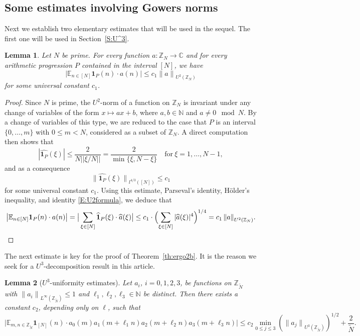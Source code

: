 \documentclass[11pt]{amsart}
\newtheorem{lemma}{Lemma}[section]
\theoremstyle{definition}
\begin{document}
\subsection{Some estimates involving Gowers norms}
\label{subsec:gowers}
Next we establish
two elementary estimates that will be  used in the sequel.
The first one will be used in Section~\ref{S:U^3}.
\begin{lemma}
\label{lem:U2-intervals}  Let $N$ be prime. For every  function $a\colon {{\mathbb Z}}_N\to {{\mathbb C}}$
 and for every arithmetic progression $P$ contained in the
interval $[N]$, we have
$$
 \big|{{\mathbb E}}_{n\in [N]}{\mathbf{1}}_P(n)\cdot a(n) \big|\leq
 c_1{\lVert {a} \rVert}_{U^2({{\mathbb Z}}_N)}
$$
for some universal constant $c_1$.
\end{lemma}
\begin{proof}
Since $N$ is prime, the $U^2$-norm of a function on ${{\mathbb Z}}_N$ is
invariant under any change of variables of the form $x\mapsto ax+b$,
where $a,b\in{{\mathbb N}}$  and $a\neq 0 \! \! \! \mod{N}$. By a change of variables of this
type, we are reduced to the case that $P$ is an interval
$\{0,\dots,m\}$ with $0\leq m<N$, considered as a subset of
${{\mathbb Z}}_N$. A direct computation then shows that
$$
 |\widehat{{\mathbf{1}}_P}(\xi)|\leq
\frac{2}{N||\xi/N||}= \frac{2}{\min\{\xi,N-\xi\}}  \quad \text{for
}\ \xi=1,\ldots,N-1,
$$
and as a consequence
$$
{\lVert {\widehat{{\mathbf{1}}_P}(\xi)} \rVert}_{l^{4/3}([N])}
\leq c_1
$$
for some universal constant $c_1$. Using this estimate, Parseval's
identity,   H\"older's inequality, and identity \eqref{E:U2formula},
we deduce that
$$
\big|{{\mathbb E}}_{n\in [N]}{\mathbf{1}}_P(n)\cdot a(n) \big|=\big|\sum_{\xi\in [N]}\widehat {\mathbf{1}}_P(\xi)\cdot \widehat a(\xi) \big|\leq
c_1\cdot\Bigl(\sum_{\xi\in[N]} |\widehat a(\xi)|^4\Bigr)^{1/4}=
c_1\,{\lVert a \rVert}_{U^2({{\mathbb Z}}_N)}.{}
$$

\end{proof}
The next estimate is key for the proof of Theorem~\ref{th:ergo2b}.
It is the reason we seek for  a $U^3$-decomposition result in this
article.
\begin{lemma}[$U^3$-uniformity estimates]\label{L:UnifromityEstimates2}
Let  $a_i$, $i=0,1,2,3$, be functions on ${{{\mathbb Z}}_{\widetilde N}}$ with
${\lVert {a_i} \rVert}_{L^\infty({{{\mathbb Z}}_{\widetilde N}})}\leq 1$ and $\ell_1,\ell_2,\ell_3\in {{\mathbb N}}$ be distinct. Then
there exists a constant $c_2$, depending only on $\ell$, such that
 $$
\big|{{\mathbb E}}_{m,n\in{{{\mathbb Z}}_{\widetilde N}}}{\mathbf{1}}_{[N]}(n)\cdot a_0(m)
a_1(m+\ell_1n) a_2(m+\ell_2n)a_3(m+\ell_3n)\big| \leq c_2
\min_{0\leq j\leq 3}({\lVert {a_j} \rVert}_{U^3({{{\mathbb Z}}_{\widetilde N}})})^{1/2}+\frac{2}{{\widetilde N}}.
$$
\end{lemma}
\end{document}
